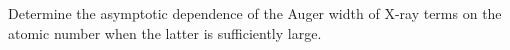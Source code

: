 \ProblemHeading Determine the asymptotic dependence of the Auger width of X-ray terms on the atomic number when the latter is sufficiently large.
